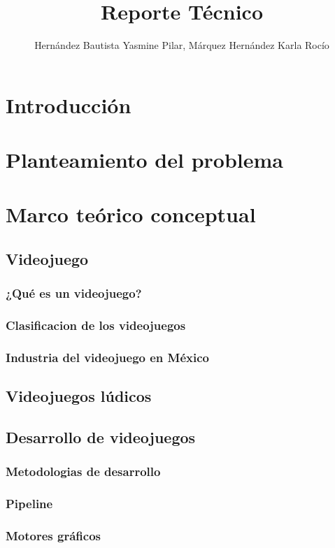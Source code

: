 \documentclass[11pt,letterpaper]{article}
\begin{document}
	\author{Hernández Bautista Yasmine Pilar, Márquez 		Hernández Karla Rocío}
	\title{Reporte Técnico}
	\maketitle
	\tableofcontents
	\section{Introducción}
	\section{Planteamiento del problema}
	\section{Marco teórico conceptual}
		\subsection{Videojuego}
			\subsubsection{¿Qué es un videojuego?}
			\subsubsection{Clasificacion de los videojuegos}
			\subsubsection{Industria del videojuego en México}	
		\subsection{Videojuegos lúdicos}		
		\subsection{Desarrollo de videojuegos}
			\subsubsection{Metodologias de desarrollo}
			\subsubsection{Pipeline}
			\subsubsection{Motores gráficos}
\end{document}
